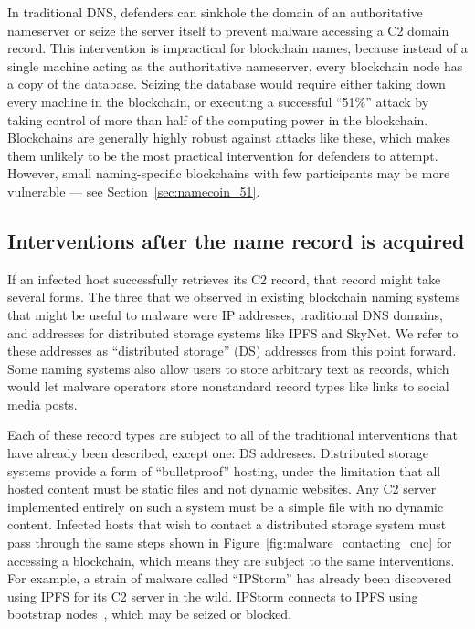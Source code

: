In traditional DNS, defenders can sinkhole the domain of an 
authoritative nameserver or seize the server itself to 
prevent malware accessing a C2 domain record. This 
intervention is impractical for blockchain names, 
because instead of a single machine acting as the 
authoritative nameserver, every blockchain node has a copy of 
the database. Seizing the database would require either taking down 
every machine in the blockchain, or executing a successful ``51\%'' attack by 
taking control of more than half of the computing power in the blockchain. 
Blockchains are generally highly robust against attacks like these, which makes 
them unlikely to be the most practical intervention for defenders to attempt. 
However, small naming-specific
blockchains with few participants may be more vulnerable --- see 
Section~\ref{sec:namecoin_51}.

\subsection{Interventions after the name record is acquired}
\label{sec:interventions_at_name}

If an infected host successfully retrieves its C2 record, 
that record might take several forms. The three that we 
observed in existing blockchain naming systems that might be 
useful to malware were IP addresses, traditional DNS domains, 
and addresses for distributed storage systems like IPFS and 
SkyNet. We refer to these addresses as ``distributed 
storage'' (DS) addresses from this point forward. Some naming 
systems also allow users to store arbitrary text as 
records, which would let malware operators store nonstandard 
record types like links to social media posts. 

Each of these record types are subject to all of the 
traditional interventions that have already 
been described, except one: DS addresses. Distributed storage 
systems provide a form of ``bulletproof'' hosting, under the limitation
that all hosted content must be static files and not dynamic 
websites. Any C2 server implemented entirely on such a 
system must be a simple file with no 
dynamic content. Infected hosts that wish to contact a distributed storage 
system must pass through the same steps shown in 
Figure~\ref{fig:malware_contacting_cnc} for accessing a blockchain, which means 
they are subject to the same interventions. For example, a strain of malware 
called ``IPStorm'' has already been discovered using IPFS for its C2 server in 
the wild. IPStorm connects to IPFS using bootstrap nodes~\cite{ipstorm_anomali, 
ipstorm_zdnet}, which may be seized or blocked.

